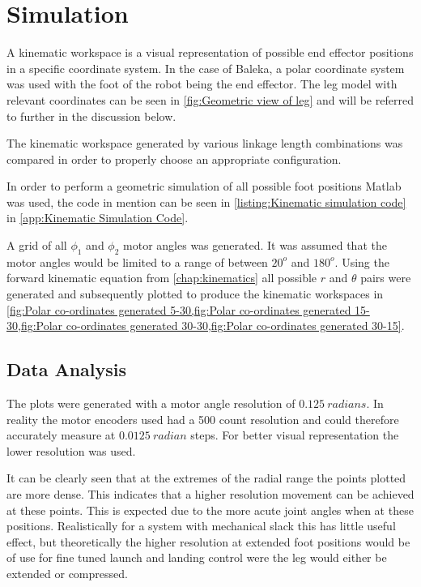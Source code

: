 \section{Simulation}
\label{sec:Simulation-Kinematics}

A kinematic workspace is a visual representation of possible end effector positions in a specific coordinate system. In the case of Baleka, a polar coordinate system was used with the foot of the robot being the end effector. The leg model with relevant coordinates can be seen in \cref{fig:Geometric view of leg} and will be referred to further in the discussion below.

The kinematic workspace generated by various linkage length combinations was compared in order to properly choose an appropriate configuration. 

In order to perform a geometric simulation of all possible foot positions Matlab was used, the code in mention can be seen in \cref{listing:Kinematic simulation code} in \cref{app:Kinematic Simulation Code}. 

A grid of all $\phi_1$ and $\phi_2$ motor angles was generated. It was assumed that the motor angles would be limited to a range of between $20^o$ and $180^o$. Using the forward kinematic equation from \cref{chap:kinematics} all possible $r$ and $\theta$ pairs were generated and subsequently plotted to produce the kinematic workspaces in \cref{fig:Polar co-ordinates generated 5-30,fig:Polar co-ordinates generated 15-30,fig:Polar co-ordinates generated 30-30,fig:Polar co-ordinates generated 30-15}.

\subsection{Data Analysis}
The plots were generated with a motor angle resolution of $0.125\ radians$. In reality the motor encoders used had a 500 count resolution and could therefore accurately measure at $0.0125\ radian$ steps. For better visual representation the lower resolution was used. 

It can be clearly seen that at the extremes of the radial range the points plotted are more dense. This indicates that a higher resolution movement can be achieved at these points. This is expected due to the more acute joint angles when at these positions. Realistically for a system with mechanical slack this has little useful effect, but theoretically the higher resolution at extended foot positions would be of use for fine tuned launch and landing control were the leg would either be extended or compressed. 

